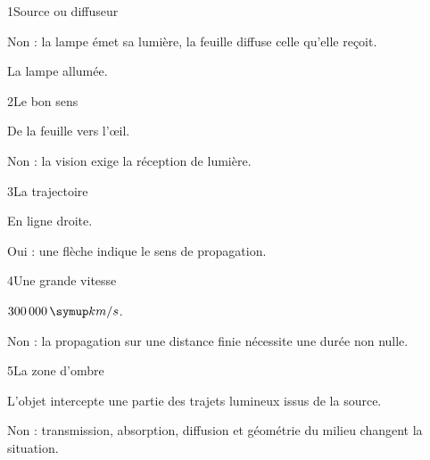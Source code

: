 \par\noindent\begin{minipage}{\linewidth}
\begin{corrige}{1}{Source ou diffuseur}
\begin{questions}
\item Non : la lampe émet sa lumière, la feuille diffuse celle qu’elle reçoit.
\item La lampe allumée.
\end{questions}
\end{corrige}
\end{minipage}
\par\noindent\begin{minipage}{\linewidth}
\begin{corrige}{2}{Le bon sens}
\begin{questions}
\item De la feuille vers l’œil.
\item Non : la vision exige la réception de lumière.
\end{questions}
\end{corrige}
\end{minipage}
\par\noindent\begin{minipage}{\linewidth}
\begin{corrige}{3}{La trajectoire}
\begin{questions}
\item En ligne droite.
\item Oui : une flèche indique le sens de propagation.
\end{questions}
\end{corrige}
\end{minipage}
\par\noindent\begin{minipage}{\linewidth}
\begin{corrige}{4}{Une grande vitesse}
\begin{questions}
\item $300\,000\unite{km/s}$.
\item Non : la propagation sur une distance finie nécessite une durée non nulle.
\end{questions}
\end{corrige}
\end{minipage}
\par\noindent\begin{minipage}{\linewidth}
\begin{corrige}{5}{La zone d’ombre}
\begin{questions}
\item L’objet intercepte une partie des trajets lumineux issus de la source.
\item Non : transmission, absorption, diffusion et géométrie du milieu changent la situation.
\end{questions}
\end{corrige}
\end{minipage}
